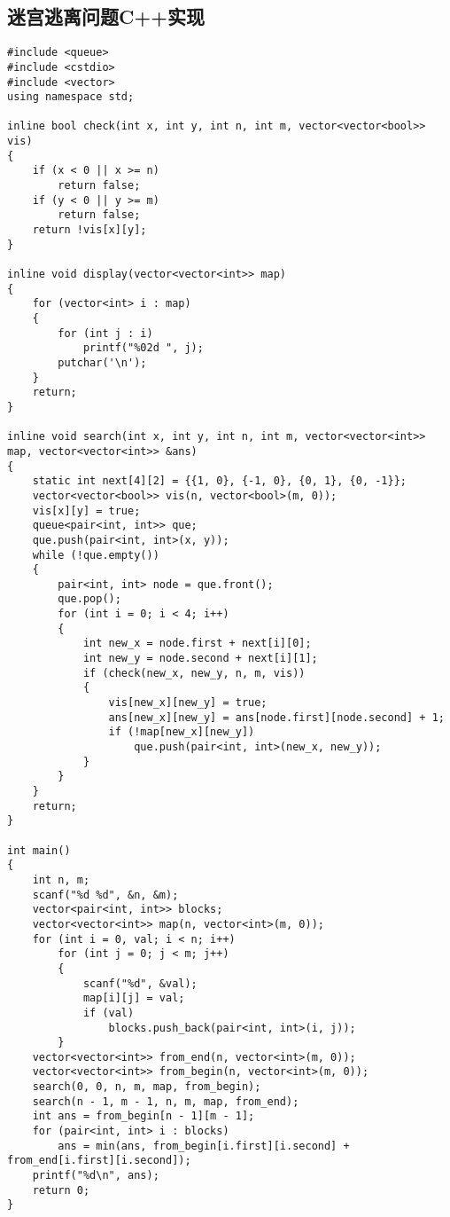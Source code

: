 \documentclass{article}
\begin{document}
\subsection{迷宫逃离问题C++实现}

\begin{lstlisting}
#include <queue>
#include <cstdio>
#include <vector>
using namespace std;

inline bool check(int x, int y, int n, int m, vector<vector<bool>> vis)
{
    if (x < 0 || x >= n)
        return false;
    if (y < 0 || y >= m)
        return false;
    return !vis[x][y];
}

inline void display(vector<vector<int>> map)
{
    for (vector<int> i : map)
    {
        for (int j : i)
            printf("%02d ", j);
        putchar('\n');
    }
    return;
}

inline void search(int x, int y, int n, int m, vector<vector<int>> map, vector<vector<int>> &ans)
{
    static int next[4][2] = {{1, 0}, {-1, 0}, {0, 1}, {0, -1}};
    vector<vector<bool>> vis(n, vector<bool>(m, 0));
    vis[x][y] = true;
    queue<pair<int, int>> que;
    que.push(pair<int, int>(x, y));
    while (!que.empty())
    {
        pair<int, int> node = que.front();
        que.pop();
        for (int i = 0; i < 4; i++)
        {
            int new_x = node.first + next[i][0];
            int new_y = node.second + next[i][1];
            if (check(new_x, new_y, n, m, vis))
            {
                vis[new_x][new_y] = true;
                ans[new_x][new_y] = ans[node.first][node.second] + 1;
                if (!map[new_x][new_y])
                    que.push(pair<int, int>(new_x, new_y));
            }
        }
    }
    return;
}

int main()
{
    int n, m;
    scanf("%d %d", &n, &m);
    vector<pair<int, int>> blocks;
    vector<vector<int>> map(n, vector<int>(m, 0));
    for (int i = 0, val; i < n; i++)
        for (int j = 0; j < m; j++)
        {
            scanf("%d", &val);
            map[i][j] = val;
            if (val)
                blocks.push_back(pair<int, int>(i, j));
        }
    vector<vector<int>> from_end(n, vector<int>(m, 0));
    vector<vector<int>> from_begin(n, vector<int>(m, 0));
    search(0, 0, n, m, map, from_begin);
    search(n - 1, m - 1, n, m, map, from_end);
    int ans = from_begin[n - 1][m - 1];
    for (pair<int, int> i : blocks)
        ans = min(ans, from_begin[i.first][i.second] + from_end[i.first][i.second]);
    printf("%d\n", ans);
    return 0;
}
\end{lstlisting}
\end{document}
